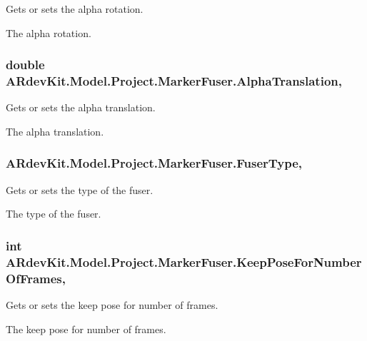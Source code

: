 Gets or sets the alpha rotation. 

The alpha rotation. \hypertarget{class_a_rdev_kit_1_1_model_1_1_project_1_1_marker_fuser_ac5342436a234bcd887fc29684e771228}{
\subsubsection[{Alpha\-Translation}]{\setlength{\rightskip}{0pt plus 5cm}double A\-Rdev\-Kit.\-Model.\-Project.\-Marker\-Fuser.\-Alpha\-Translation\hspace{0.3cm}{\ttfamily [get]}, {\ttfamily [set]}}}\label{class_a_rdev_kit_1_1_model_1_1_project_1_1_marker_fuser_ac5342436a234bcd887fc29684e771228}


Gets or sets the alpha translation. 

The alpha translation. \hypertarget{class_a_rdev_kit_1_1_model_1_1_project_1_1_marker_fuser_af2d47a34650e67792191c3d2553aae3f}{
\subsubsection[{Fuser\-Type}]{ A\-Rdev\-Kit.\-Model.\-Project.\-Marker\-Fuser.\-Fuser\-Type\hspace{0.3cm}{\ttfamily [get]}, {\ttfamily [set]}}}\label{class_a_rdev_kit_1_1_model_1_1_project_1_1_marker_fuser_af2d47a34650e67792191c3d2553aae3f}


Gets or sets the type of the fuser. 

The type of the fuser. \hypertarget{class_a_rdev_kit_1_1_model_1_1_project_1_1_marker_fuser_abe44b1d8d25a194883d2d676ab020f23}{
\subsubsection[{Keep\-Pose\-For\-Number\-Of\-Frames}]{\setlength{\rightskip}{0pt plus 5cm}int A\-Rdev\-Kit.\-Model.\-Project.\-Marker\-Fuser.\-Keep\-Pose\-For\-Number\-Of\-Frames\hspace{0.3cm}{\ttfamily [get]}, {\ttfamily [set]}}}\label{class_a_rdev_kit_1_1_model_1_1_project_1_1_marker_fuser_abe44b1d8d25a194883d2d676ab020f23}


Gets or sets the keep pose for number of frames. 

The keep pose for number of frames. 